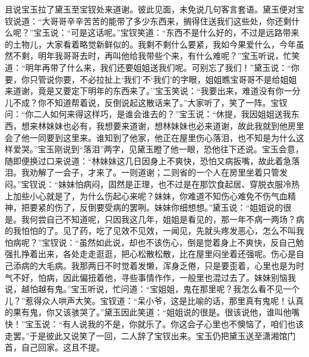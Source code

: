 且说宝玉拉了黛玉至宝钗处来道谢。彼此见面，未免说几句客言套语。黛玉便对宝钗说道：``大哥哥辛辛苦苦的能带了多少东西来，搁得住送我们这些处，你还剩什么呢？''宝玉说：``可是这话呢。''宝钗笑道：``东西不是什么好的，不过是远路带来的土物儿，大家看着略觉新鲜似的。我剩不剩什么要紧，我如今果爱什么，今年虽然不剩，明年我哥哥去时，再叫他给我带些个来，有什么难呢？''宝玉听说，忙笑道：``明年再带了什么来，我们还要姐姐送我们呢。可别忘了我们！''黛玉说：``你要，你只管说你要，不必拉扯上`我们'不`我们'的字眼，姐姐瞧宝哥哥不是给姐姐来道谢，竟是又要定下明年的东西来了。''宝玉笑说：``我要出来，难道没有你一分儿不成？你不知道帮着说，反倒说起这散话来了。''大家听了，笑了一阵。宝钗问：``你二人如何来得这样巧，是谁会谁去的？''宝玉说：``休提，我因姐姐送我东西，想来林妹妹也必有，我想要来道谢，想林妹妹也必来道谢，故此我就到他房里会了他一同要到这里来。谁知到了他家，他正在屋里伤心落泪，也不知是为什么这样爱哭。''宝玉刚说到``落泪''两字，见黛玉瞪了他一眼，恐他往下还说。宝玉会意，随即便换过口来说道：``林妹妹这几日因身上不爽快，恐怕又病扳嘴，故此着急落泪。我劝解了一会子，才来了。一则道谢；二则省的一个人在房里坐着只管发闷。''宝钗说：``妹妹怕病闷，固然是正理，也不过是在那饮食起居、穿脱衣服冷热上加些小心就是了，为什么伤起心来呢？妹妹，你难道不知伤心难免不伤气血精神，把要紧的伤了，反倒要受病的罢咧。妹妹你细想想。''黛玉说：``姐姐说的很是。我何尝自己不知道呢，只因我这几年，姐姐是看见的，那一年不病一两场？病的我怕怕的了。见了药，吃了见效不见效，一闻见，先就头疼发恶心，怎么不叫我怕病呢？''宝钗说：``虽然如此说，却也不该伤心，倒是觉着身上不爽快，反自己勉强扎挣着出来，各处走走逛逛，把心松散松散，比在屋里闷坐着还强呢。伤心是自己添病的大毛病。我那两日不时觉着发懒，浑身乏倦，只是要歪着，心里也是为时气不好，怕病，因此偏扭着他，寻些事情作作，一般里也混过去了。妹妹别恼我说，越怕越有鬼。''宝玉听说，忙问道：``宝姐姐，鬼在那里呢？我怎么看不见一个儿？''惹得众人哄声大笑。宝钗道：``呆小爷，这是比喻的话，那里真有鬼呢！认真的果有鬼，你又该骇哭了。''黛玉因此笑道：``姐姐说的很是。很该说他，谁叫他嘴快！''宝玉说：``有人说我的不是，你就乐了。你这会子心里也不懊恼了，咱们也该走罢。''于是彼此又说笑了一回，二人辞了宝钗出来。宝玉仍把黛玉送至潇湘馆门首，自己回家。这且不提。

